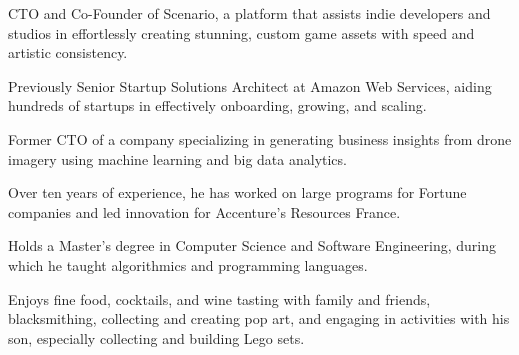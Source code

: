 
\begin{cvparagraph}

CTO and Co-Founder of Scenario, a platform that assists indie developers and studios in effortlessly creating stunning, custom game assets with speed and artistic consistency.

Previously Senior Startup Solutions Architect at Amazon Web Services, aiding hundreds of startups in effectively onboarding, growing, and scaling.

Former CTO of a company specializing in generating business insights from drone imagery using machine learning and big data analytics.

Over ten years of experience, he has worked on large programs for Fortune companies and led innovation for Accenture’s Resources France.

Holds a Master’s degree in Computer Science and Software Engineering, during which he taught algorithmics and programming languages.

Enjoys fine food, cocktails, and wine tasting with family and friends, blacksmithing, collecting and creating pop art, and engaging in activities with his son, especially collecting and building Lego sets.
\end{cvparagraph}

